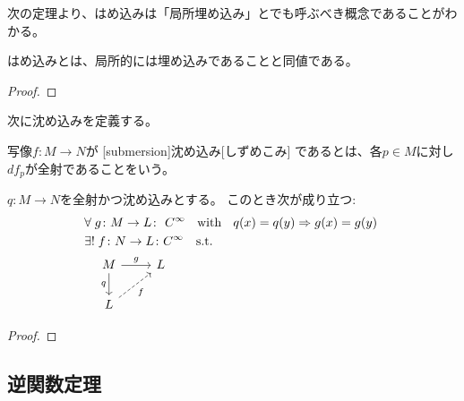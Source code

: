 \documentclass[report]{jlreq}
\begin{document}
\begin{example}[単射はめ込みだが埋め込みでない例]
\end{example}

次の定理より、はめ込みは「局所埋め込み」とでも呼ぶべき概念であることがわかる。

\begin{theorem}[局所埋め込み定理]
    はめ込みとは、局所的には埋め込みであることと同値である。
    \TODO{}
\end{theorem}

\begin{proof}
    \TODO{}
\end{proof}

次に沈め込みを定義する。

\begin{definition}[沈め込み]
    {\smooth}写像$f \colon M \to N$が
    [submersion]{沈め込み}[しずめこみ]
    であるとは、各$p \in M$に対し$df_p$が全射であることをいう。
\end{definition}

\begin{theorem}[沈め込みの普遍性]
    $q \colon M \to N$を全射かつ沈め込みとする。
    このとき次が成り立つ:
    \begin{alignat}{1}
        &\forall \; g \colon M \to L
            \colon \text{
                {\smooth}
                \; with \;
                $q(x) = q(y) \Rightarrow g(x) = g(y)$
            } \\
        &\exists! \; f \colon N \to L
            \colon \smooth
            \quad \text{s.t.} \quad \\
        &\quad \begin{tikzcd}[ampersand replacement=\&]
            M \ar{d}[swap]{q} \ar{r}{g} \& L \\
            L \ar[dashed]{ru}[swap]{f}
        \end{tikzcd}
    \end{alignat}
\end{theorem}

\begin{proof}
    \TODO{}
\end{proof}

\subsection{逆関数定理}

\end{document}
